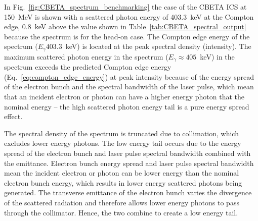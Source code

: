 \documentclass[../main.tex]{subfiles}
\begin{document}
In Fig.~\ref{fig:CBETA_spectrum_benchmarking} the case of the CBETA ICS at 150~\si{\mega\electronvolt} is shown with a scattered photon energy of 403.3~\si{\kilo\electronvolt} at the Compton edge, 0.8~\si{\kilo\electronvolt} above the value shown in Table~\ref{tab:CBETA_spectral_output} because the spectrum is for the head-on case. The Compton edge energy of the spectrum ($E_{\gamma}403.3$~\si{\kilo\electronvolt}) is located at the peak spectral density (intensity). The maximum scattered photon energy in the spectrum ($E_{\gamma}\approx405$~\si{\kilo\electronvolt}) in the spectrum exceeds the predicted Compton edge energy (Eq.~\ref{eq:compton_edge_energy}) at peak intensity because of the energy spread of the electron bunch and the spectral bandwidth of the laser pulse, which mean that an incident electron or photon can have a higher energy photon that the nominal energy -- the high scattered photon energy tail is a pure energy spread effect.

The spectral density of the spectrum is truncated due to collimation, which excludes lower energy photons. The low energy tail occurs due to the energy spread of the electron bunch and laser pulse spectral bandwidth combined with the emittance. Electron bunch energy spread and laser pulse spectral bandwidth mean the incident electron or photon can be lower energy than the nominal electron bunch energy, which results in lower energy scattered photons being generated. The transverse emittance of the electron bunch varies the divergence of the scattered radiation and therefore allows lower energy photons to pass through the collimator. Hence, the two combine to create a low energy tail.
\end{document}
